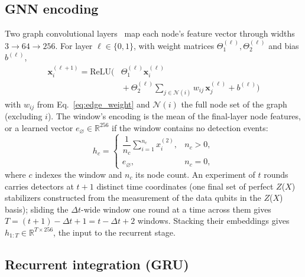 \documentclass[aps,prxquantum,twocolumn,superscriptaddress,nofootinbib]{revtex4-2}
\begin{document}
\subsection{GNN encoding}

Two graph convolutional layers~\cite{morris2019weisfeiler} map each node's feature vector through widths $3 \to 64 \to 256$. For layer $\ell \in \{0, 1\}$, with weight matrices $\Theta_1^{(\ell)}, \Theta_2^{(\ell)}$ and bias $b^{(\ell)}$,
\begin{equation}
\begin{split}
\mathbf{x}_i^{(\ell+1)} = \mathrm{ReLU}\Big( &\Theta_1^{(\ell)} \mathbf{x}_i^{(\ell)} \\
&{}+ \Theta_2^{(\ell)} \sum_{j \in \mathcal N(i)} w_{ij}\, \mathbf{x}_j^{(\ell)} + b^{(\ell)} \Big)
\end{split}
\label{eq:graphconv}
\end{equation}
with $w_{ij}$ from Eq.~\eqref{eq:edge_weight} and $\mathcal N(i)$ the full node set of the graph (excluding $i$). The window's encoding is the mean of the final-layer node features, or a learned vector $e_\varnothing \in \mathbb{R}^{256}$ if the window contains no detection events:
\begin{equation}
h_c =
\begin{cases}
\dfrac{1}{n_c} \displaystyle\sum_{i=1}^{n_c} x_i^{(2)}, & n_c > 0, \\[1.2em]
e_\varnothing, & n_c = 0,
\end{cases}
\label{eq:empty}
\end{equation}
where $c$ indexes the window and $n_c$ its node count. An experiment of $t$ rounds carries detectors at $t+1$ distinct time coordinates (one final set of perfect $Z$($X$) stabilizers constructed from the measurement of the data qubits in the $Z$($X$) basis); sliding the $\Delta t$-wide window one round at a time across them gives $T = (t+1) - \Delta t + 1 = t - \Delta t + 2$ windows. Stacking their embeddings gives $h_{1:T} \in \mathbb{R}^{T \times 256}$, the input to the recurrent stage.

\subsection{Recurrent integration (GRU)}
\end{document}
